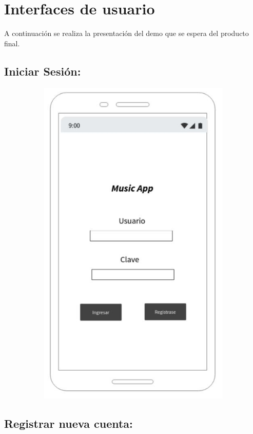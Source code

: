 \section{Interfaces de usuario}
A continuación se realiza la presentación del demo que se espera del producto final.
\subsection{Iniciar Sesión:}

\begin{figure}[h!]
 \centering
\includegraphics[width=12cm, height=16cm,keepaspectratio=true]{Desarrollo/Interfaces/imgs/wire1.JPG}
\end{figure}
\newpage
\subsection{Registrar nueva cuenta:}

